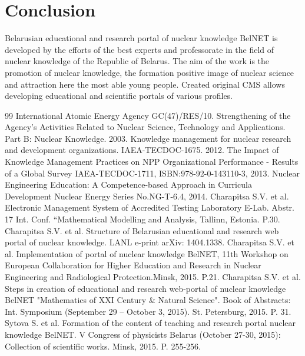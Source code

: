 \documentclass[12pt]{article}
\begin{document}
\section {Conclusion}

Belarusian educational and research portal of nuclear knowledge
BelNET is developed by the efforts of the best experts and
professorate in the field of nuclear knowledge of the Republic of
Belarus. The aim of the work is the promotion of nuclear
knowledge, the formation positive image of nuclear science and
attraction here the most able young people.
Created original CMS allows developing educational and scientific
portals of various profiles.


\begin {thebibliography} {99}
 International Atomic Energy Agency GC(47)/RES/10.
Strengthening of the Agency’s Activities Related to Nuclear Science, Technology and Applications.
Part B: Nuclear Knowledge. 2003.
 Knowledge management for nuclear research and development organizations.
IAEA-TECDOC-1675. 2012.
 The Impact of Knowledge Management Practices on NPP Organizational Performance - Results of a Global Survey
IAEA-TECDOC-1711, ISBN:978-92-0-143110-3, 2013.
 Nuclear Engineering Education:
A Competence-based Approach in Curricula Development
Nuclear Energy Series No.NG-T-6.4, 2014.
 Charapitsa S.V. et al. Electronic Management System of
Accredited Testing Laboratory E-Lab. Abstr. 17 Int. Conf.
“Mathematical Modelling and Analysis, Tallinn, Estonia. P.30.
 Charapitsa S.V. et al. Structure of Belarusian educational
and research web portal of nuclear knowledge. LANL e-print arXiv: 1404.1338.
 Charapitsa S.V. et al. Implementation of
portal of nuclear knowledge BelNET, 11th Workshop on European
Collaboration for Higher Education and Research in Nuclear
Engineering and Radiological Protection.Minsk, 2015. P.21.
 Charapitsa S.V. et al. Steps in creation of educational
and research web-portal of nuclear knowledge BelNET "Mathematics
of XXI Century \& Natural Science". Book of Abstracts: Int.
Symposium (September 29 -- October 3, 2015). St. Petersburg, 2015.
P. 31.
 Sytova S. et al. Formation of the content
of teaching and research portal nuclear knowledge BelNET. V
Congress of physicists Belarus (October 27-30, 2015): Collection of
scientific works. Minsk, 2015. P. 255-256.


\end{thebibliography}
\end{document}
